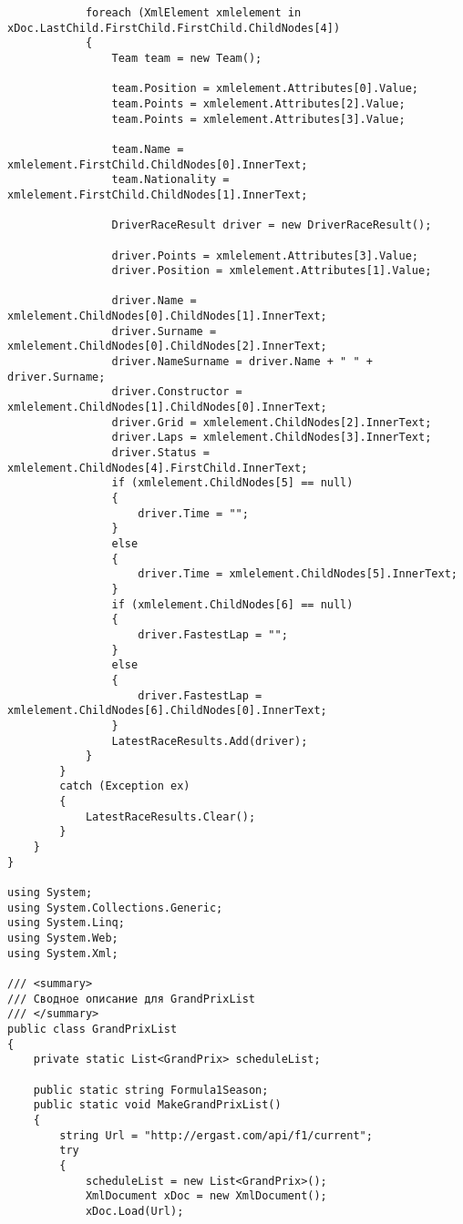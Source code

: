 \documentclass[14pt,a4paper]{extreport}
\begin{document}
\begin{landscape}
\begin{lstlisting}
            foreach (XmlElement xmlelement in xDoc.LastChild.FirstChild.FirstChild.ChildNodes[4])
            {
                Team team = new Team();

                team.Position = xmlelement.Attributes[0].Value;
                team.Points = xmlelement.Attributes[2].Value;
                team.Points = xmlelement.Attributes[3].Value;

                team.Name = xmlelement.FirstChild.ChildNodes[0].InnerText;
                team.Nationality = xmlelement.FirstChild.ChildNodes[1].InnerText;

                DriverRaceResult driver = new DriverRaceResult();

                driver.Points = xmlelement.Attributes[3].Value;
                driver.Position = xmlelement.Attributes[1].Value;

                driver.Name = xmlelement.ChildNodes[0].ChildNodes[1].InnerText;
                driver.Surname = xmlelement.ChildNodes[0].ChildNodes[2].InnerText;
                driver.NameSurname = driver.Name + " " + driver.Surname; 
                driver.Constructor = xmlelement.ChildNodes[1].ChildNodes[0].InnerText;
                driver.Grid = xmlelement.ChildNodes[2].InnerText;
                driver.Laps = xmlelement.ChildNodes[3].InnerText;
                driver.Status = xmlelement.ChildNodes[4].FirstChild.InnerText;
                if (xmlelement.ChildNodes[5] == null)
                {
                    driver.Time = "";
                }
                else
                {
                    driver.Time = xmlelement.ChildNodes[5].InnerText;
                }
                if (xmlelement.ChildNodes[6] == null)
                {
                    driver.FastestLap = "";
                }
                else
                {
                    driver.FastestLap = xmlelement.ChildNodes[6].ChildNodes[0].InnerText;
                }
                LatestRaceResults.Add(driver);
            }
        }
        catch (Exception ex)
        {
            LatestRaceResults.Clear();
        }
    }
}

using System;
using System.Collections.Generic;
using System.Linq;
using System.Web;
using System.Xml;

/// <summary>
/// Сводное описание для GrandPrixList
/// </summary>
public class GrandPrixList
{
    private static List<GrandPrix> scheduleList;

	public static string Formula1Season;
    public static void MakeGrandPrixList()
    {
        string Url = "http://ergast.com/api/f1/current";
        try
        {
            scheduleList = new List<GrandPrix>();
            XmlDocument xDoc = new XmlDocument();
            xDoc.Load(Url);


\end{lstlisting}
\end{landscape}
\end{document}
